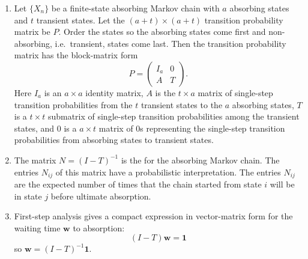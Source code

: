 \documentclass[12pt]{article}
\begin{document}
\begin{enumerate}
    \item
        Let \( \{ X_n \} \) be a finite-state absorbing Markov chain with \( a \)
        absorbing states and \( t \) transient states.  Let the \( (a + t)
        \times (a + t) \) transition probability matrix be \( P \).  Order the
        states so the absorbing states come first and non-absorbing, i.e.\
        transient, states come last. 
        Then the transition probability matrix has the block-matrix form
        \[
            P =
            \begin{pmatrix}
                I_a & 0 \\
                A & T
            \end{pmatrix}.
        \]
        Here \( I_{a} \) is an \( a \times a \) identity matrix, \( A \) is the \(
        t \times a \) matrix of single-step transition probabilities from the \(
        t \) transient states to the \( a \) absorbing states, \( T \) is a \( t
        \times t \) submatrix of single-step transition probabilities among the
        transient states, and \( 0 \) is a \( a \times t \) matrix of \( 0 \)s
        representing the single-step transition probabilities from absorbing
        states to transient states.
    \item
        The matrix \( N = (I-T)^{-1} \) is the %
        \index{fundamental matrix}
        for the absorbing Markov chain.  The entries \( N_{ij} \) of
        this matrix have a probabilistic interpretation.  The entries \(
        N_{ij} \) are the expected number of times that the chain
        started from state \( i \) will be in state \( j \) before
        ultimate absorption.
    \item
        First-step analysis gives a compact expression in
        vector-matrix form for the waiting time \(
        \mathbf{w} \) to absorption:
        \[
            (I - T) \mathbf{w} = \mathbf{1}
        \] so \( \mathbf{w} = (I-T)^{-1} \mathbf{1} \).
\end{enumerate}

\hr

\end{document}

